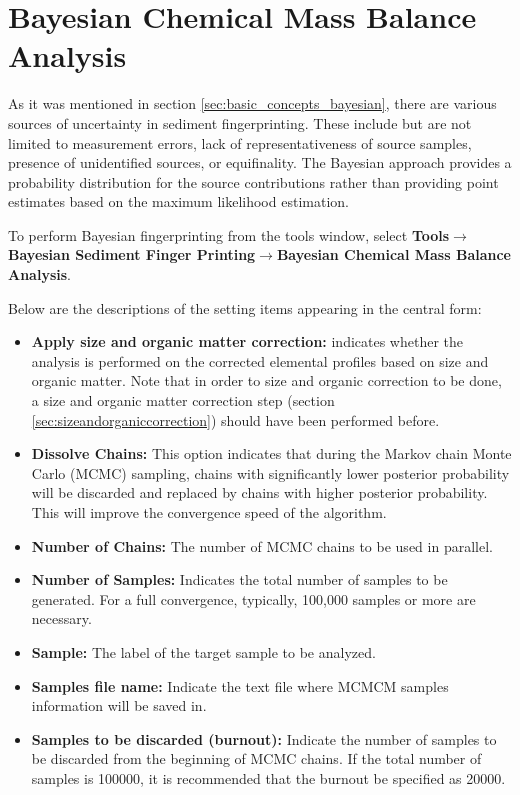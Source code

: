 \documentclass[12pt]{report}
\begin{document}
\section{Bayesian Chemical Mass Balance Analysis}
As it was mentioned in section \ref{sec:basic_concepts_bayesian}, there are various sources of uncertainty in sediment fingerprinting. These include but are not limited to measurement errors, lack of representativeness of source samples, presence of unidentified sources, or equifinality. The Bayesian approach provides a probability distribution for the source contributions rather than providing point estimates based on the maximum likelihood estimation. 

To perform Bayesian fingerprinting from the tools window, select \textbf{Tools}$\rightarrow$\textbf{Bayesian Sediment Finger Printing}$\rightarrow$\textbf{Bayesian Chemical Mass Balance Analysis}. 

Below are the descriptions of the setting items appearing in the central form:

\begin{itemize}
    \item \textbf{Apply size and organic matter correction: } indicates whether the analysis is performed on the corrected elemental profiles based on size and organic matter. Note that in order to size and organic correction to be done, a size and organic matter correction step (section \ref{sec:sizeandorganiccorrection}) should have been performed before. 
    \item \textbf{Dissolve Chains: } This option indicates that during the Markov chain Monte Carlo (MCMC) sampling, chains with significantly lower posterior probability will be discarded and replaced by chains with higher posterior probability. This will improve the convergence speed of the algorithm. 
    \item \textbf{Number of Chains: } The number of MCMC chains to be used in parallel. 
    \item \textbf{Number of Samples: } Indicates the total number of samples to be generated. For a full convergence, typically, 100,000 samples or more are necessary. 
    \item \textbf{Sample: } The label of the target sample to be analyzed. 
    \item \textbf{Samples file name: } Indicate the text file where MCMCM samples information will be saved in. 
    \item \textbf{Samples to be discarded (burnout): } Indicate the number of samples to be discarded from the beginning of MCMC chains. If the total number of samples is 100000, it is recommended that the burnout be specified as 20000. 
\end{itemize}
\end{document}
